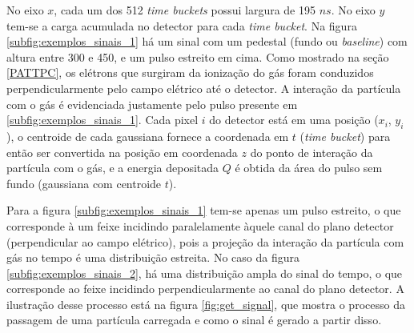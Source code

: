 \documentclass[a4paper,12pt,oneside]{book}
\begin{document}
\par No eixo $x$, cada um dos 512 \textit{time buckets} possui largura de 195 $n s$. No eixo $y$ tem-se a carga acumulada no detector para cada \textit{time bucket}. Na figura \ref{subfig:exemplos_sinais_1} há um sinal com um pedestal (fundo ou \textit{baseline}) com altura entre 300 e 450, e um pulso estreito em cima. Como mostrado na seção \ref{PATTPC}, os elétrons que surgiram da ionização do gás foram conduzidos perpendicularmente pelo campo elétrico até o detector. A interação da partícula com o gás é evidenciada justamente pelo pulso presente em \ref{subfig:exemplos_sinais_1}. Cada pixel $i$ do detector está em uma posição ($x_i$, $y_i$), o centroide de cada gaussiana fornece a coordenada em $t$ (\textit{time bucket}) para então ser convertida na posição em coordenada $z$ do ponto de interação da partícula com o gás, e a energia depositada $Q$ é obtida da área do pulso sem fundo (gaussiana com centroide $t$).

\par Para a figura \ref{subfig:exemplos_sinais_1} tem-se apenas um pulso estreito, o que corresponde à um feixe incidindo paralelamente àquele canal do plano detector (perpendicular ao campo elétrico), pois a projeção da interação da partícula com gás no tempo é uma distribuição estreita. No caso da figura \ref{subfig:exemplos_sinais_2}, há uma distribuição ampla do sinal do tempo, o que corresponde ao feixe incidindo perpendicularmente ao canal do plano detector. A ilustração desse processo está na figura \ref{fig:get_signal}, que mostra o processo da passagem de uma partícula carregada e como o sinal é gerado a partir disso.



\end{document}
